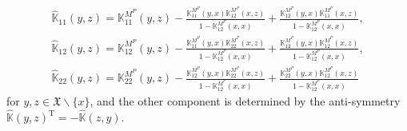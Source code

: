 \documentclass[pdftex]{sigma}
\numberwithin{equation}{section}
\newcommand{\mfrak}[1]{\mathfrak{#1}}
\newcommand{\mbb}[1]{\mathbb{#1}}
\newcommand{\mrm}[1]{\mathrm{#1}}
\newcommand{\what}[1]{\widehat{#1}}
\begin{document}
\begin{gather*}
\what{\mbb{K}}_{11}(y,z) =\mbb{K}^{M^{P}}_{11}(y,z)-\frac{\mbb{K}^{M^{P}}_{11}(y,x)\mbb{K}^{M^{P}}_{12}(x,z)}{1-\mbb{K}^{M^{P}}_{12}(x,x)}+\frac{\mbb{K}^{M^{P}}_{12}(y,x)\mbb{K}^{M^{P}}_{11}(x,z)}{1-\mbb{K}^{M^{P}}_{12}(x,x)}, \\
\what{\mbb{K}}_{12}(y,z) =\mbb{K}^{M^{P}}_{12}(y,z)-\frac{\mbb{K}^{M^{P}}_{11}(y,x)\mbb{K}^{M^{P}}_{22}(x,z)}{1-\mbb{K}^{M^{P}}_{12}(x,x)}+\frac{\mbb{K}^{M^{P}}_{12}(y,x)\mbb{K}^{M^{P}}_{12}(x,z)}{1-\mbb{K}^{M^{P}}_{12}(x,x)}, \\
\what{\mbb{K}}_{22}(y,z) =\mbb{K}^{M^{P}}_{22}(y,z)-\frac{\mbb{K}^{M^{P}}_{12}(y,x)\mbb{K}^{M^{P}}_{22}(x,z)}{1-\mbb{K}^{M^{P}}_{12}(x,x)}+\frac{\mbb{K}^{M^{P}}_{22}(y,x)\mbb{K}^{M^{P}}_{12}(x,z)}{1-\mbb{K}^{M^{P}}_{12}(x,x)}
\end{gather*}
for $y,z\in\mfrak{X}\backslash\{x\}$, and the other component is determined by the anti-symmetry $\what{\mbb{K}}(y,z)^{\mrm{T}}=-\what{\mbb{K}}(z,y)$.
\end{document}
